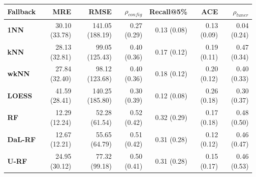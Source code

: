 \begin{tabular}{lrrrrrr}
\toprule
\textbf{Fallback} & \textbf{MRE} & \textbf{RMSE} & \textbf{$\rho_{config}$} & \textbf{Recall@5\%} & \textbf{ACE} & \textbf{$\rho_{tuner}$} \\
\midrule
\textbf{1NN} & 30.10 (33.78) & 141.05 (188.19) & 0.27 (0.29) & 0.13 (0.08) & 0.13 (0.09) & 0.04 (0.24) \\
\textbf{kNN} & 28.13 (32.81) & 99.05 (125.43) & 0.40 (0.36) & 0.17 (0.12) & 0.19 (0.11) & 0.47 (0.34) \\
\textbf{wkNN} & 27.84 (32.40) & 98.12 (123.68) & 0.40 (0.36) & 0.18 (0.12) & 0.20 (0.12) & 0.40 (0.33) \\
\textbf{LOESS} & 41.59 (28.41) & 140.25 (185.80) & 0.30 (0.39) & 0.12 (0.08) & 0.26 (0.18) & 0.30 (0.37) \\
\textbf{RF} & 12.29 (12.24) & 52.28 (61.54) & 0.52 (0.42) & 0.32 (0.29) & 0.17 (0.18) & 0.48 (0.50) \\
\textbf{DaL-RF} & 12.67 (12.21) & 55.65 (64.79) & 0.51 (0.42) & 0.31 (0.28) & 0.12 (0.12) & 0.46 (0.47) \\
\textbf{U-RF} & 24.95 (30.12) & 77.32 (99.18) & 0.50 (0.41) & 0.31 (0.28) & 0.15 (0.17) & 0.46 (0.53) \\
\bottomrule
\end{tabular}
